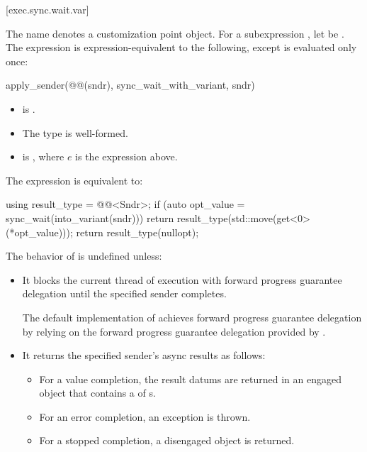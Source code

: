 [exec.sync.wait.var]{}

\pnum
The name  denotes
a customization point object.
For a subexpression ,
let  be .
The expression 
is expression-equivalent to the following,
except  is evaluated only once:
\begin{codeblock}
apply_sender(@@(sndr), sync_wait_with_variant, sndr)
\end{codeblock}
\mandates
\begin{itemize}
\item
{} is .
\item
The type 
is well-formed.
\item
{}
is , where $e$ is the  expression above.
\end{itemize}

\pnum
The expression  is equivalent to:
\begin{codeblock}
using result_type = @@<Sndr>;
if (auto opt_value = sync_wait(into_variant(sndr))) {
  return result_type(std::move(get<0>(*opt_value)));
}
return result_type(nullopt);
\end{codeblock}

\pnum
The behavior of 
is undefined unless:
\begin{itemize}
\item
It blocks the current thread of execution
with forward progress guarantee delegation
until the specified sender completes.
\begin{note}
The default implementation of  achieves
forward progress guarantee delegation by relying on
the forward progress guarantee delegation provided by .
\end{note}
\item
It returns the specified sender's async results as follows:
\begin{itemize}
\item
For a value completion,
the result datums are returned in an engaged  object
that contains a  of s.
\item
For an error completion, an exception is thrown.
\item
For a stopped completion, a disengaged  object is returned.
\end{itemize}
\end{itemize}

